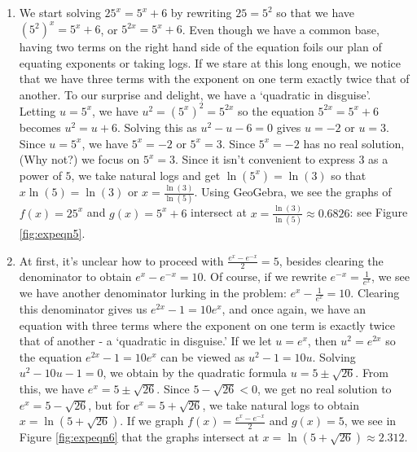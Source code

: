 {\begin{enumerate}
\item  We start solving $25^{x} = 5^{x} + 6$ by rewriting $25 = 5^2$ so that we have $\left(5^2\right)^{x} = 5^{x} + 6$, or $5^{2x} = 5^{x} + 6$.  Even though we have a common base, having two terms on the right hand side of the equation foils our plan of equating exponents or taking logs.  If we stare at this long enough, we notice that we have three terms with the exponent on one term exactly twice that of another. To our surprise and delight, we have a  `quadratic in disguise'.  Letting $u = 5^{x}$,  we have $u^2 = \left(5^{x}\right)^2 = 5^{2x}$ so the equation $5^{2x} = 5^{x} + 6$ becomes $u^2 = u + 6$.  Solving this as $u^2 - u - 6=0$ gives $u = -2$ or $u = 3$.  Since $u = 5^{x}$, we have $5^{x} = -2$ or $5^{x} = 3$.  Since $5^{x} = -2$ has no real solution, (Why not?) we focus on $5^{x} = 3$.  Since it isn't convenient to express $3$ as a power of $5$, we take natural logs and get $\ln\left(5^{x}\right) = \ln(3)$ so that $x \ln(5) = \ln(3)$ or $x = \frac{\ln(3)}{\ln(5)}$.  Using GeoGebra, we see the graphs of $f(x) = 25^{x}$ and $g(x) = 5^{x} + 6$ intersect at $x=\frac{\ln(3)}{\ln(5)} \approx 0.6826$: see Figure \ref{fig:expeqn5}.

{}

\item  At first, it's unclear how to proceed with $\frac{e^{x} - e^{-x}}{2} = 5$, besides clearing the denominator to obtain $e^{x} - e^{-x} = 10$.  Of course, if we rewrite $e^{-x} = \frac{1}{e^{x}}$, we see we have another denominator lurking in the problem:  $e^{x} - \frac{1}{e^{x}} = 10$. Clearing this denominator gives us $e^{2x} - 1 = 10e^{x}$, and once again, we have an equation with three terms where the exponent on one term is exactly twice that of another - a `quadratic in disguise.'  If we let $u = e^{x}$, then $u^2 = e^{2x}$ so the equation $e^{2x} - 1 = 10e^{x}$ can be viewed as $u^2-1 = 10u$.  Solving $u^2 - 10u - 1 = 0$, we obtain by the quadratic formula $u = 5 \pm \sqrt{26}$.  From this, we have $e^{x} = 5 \pm \sqrt{26}$.  Since $5 - \sqrt{26} < 0$, we get no real solution to $e^{x} = 5 - \sqrt{26}$, but for $e^{x} = 5 + \sqrt{26}$, we take natural logs to obtain $x = \ln\left(5 + \sqrt{26}\right)$.  If we graph $f(x) = \frac{e^{x} - e^{-x}}{2}$ and $g(x) = 5$, we see in Figure \ref{fig:expeqn6} that the graphs intersect at $x = \ln\left(5 + \sqrt{26}\right) \approx 2.312$.

{}

\end{enumerate}
}

